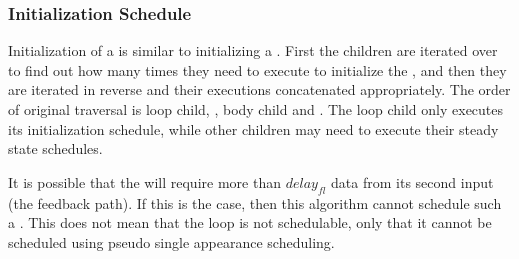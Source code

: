 \subsubsection{\feedbackloops}
\label{sec:sas-fl}

\subsubsection{Initialization Schedule}

Initialization of a \feedbackloop is similar to initializing a
\pipeline. First the children are iterated over to find out how
many times they need to execute to initialize the \feedbackloop,
and then they are iterated in reverse and their executions
concatenated appropriately. The order of original traversal is
loop child, \splitter, body child and \joiner. The loop child only
executes its initialization schedule, while other children may
need to execute their steady state schedules.

It is possible that the \joiner will require more than
$delay_{fl}$ data from its second input (the feedback path). If
this is the case, then this algorithm cannot schedule such a
\feedbackloop. This does not mean that the loop is not
schedulable, only that it cannot be scheduled using pseudo single
appearance scheduling.

